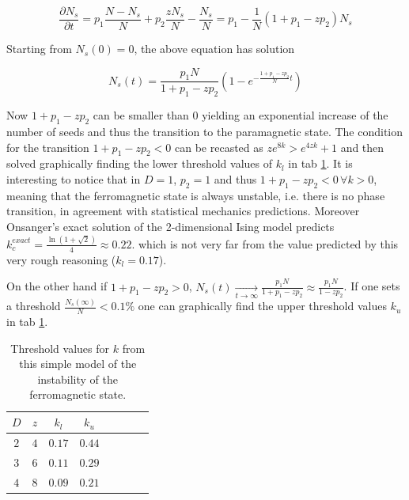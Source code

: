 \documentclass[a4paper, 11pt]{article}
\begin{document}
      \begin{equation}
        \frac{\partial N_{s}}{\partial t} = p_1\frac{N - N_{s}}{N}  + p_2 \frac{zN_s}{N}- \frac{N_{s}}{N} = p_1 - \frac{1}{N}(1 + p_1 - zp_2) N_s
      \end{equation}

      Starting from $N_s(0) = 0$, the above equation has solution

      \begin{equation}
        N_{s}(t) = \frac{p_1N}{1 + p_1 - zp_2}\left(1 - e^{-\frac{1 + p_1 -zp_2}{N}t}  \right)
      \end{equation}

      Now $1 + p_1 - zp_2$ can be smaller than 0 yielding an exponential increase of the number of seeds and thus the transition to the paramagnetic state. The condition for the transition $1 + p_1 - zp_2 < 0$ can be recasted as $ze^{8k} > e^{4zk} + 1$ and then solved graphically finding the lower threshold values of $k_l$ in tab \ref{tab:k_crit_th}.
      It is interesting to notice that in $D = 1$, $p_2 = 1$ and thus $1 + p_1 - zp_2 < 0 \, \forall k > 0$, meaning that the ferromagnetic state is always unstable, i.e. there is no phase transition, in agreement with statistical mechanics predictions. Moreover Onsanger's exact solution of the 2-dimensional Ising model predicts $k_{c}^{exact} = \frac{\ln(1 + \sqrt{2})}{4} \approx 0.22$. which is not very far from the value predicted by this very rough reasoning ($k_l = 0.17$).

      On the other hand if $1 + p_1 - zp_2 > 0$, $N_s(t) \xrightarrow[t \to \infty]{} \frac{p_1N}{1 + p_1 - zp_2} \approx \frac{p_1N}{1 - zp_2}$.
      If one sets a threshold $\frac{N_s(\infty)}{N} < 0.1\%$ one can graphically find the upper threshold values $k_u$ in tab \ref{tab:k_crit_th}.

      \begin{table}[H]
        \centering
        \begin{tabular}{cccccccc}
          \toprule
          $D$ & $z$ & $k_l$ & $k_u$ \\
          \midrule
          $2$ & $4$ & $0.17$ & $0.44$ \\
          $3$ & $6$ & $0.11$ & $0.29$ \\
          $4$ & $8$ & $0.09$ & $0.21$ \\
          \bottomrule
        \end{tabular}
        \caption{Threshold values for $k$ from this simple model of the instability of the ferromagnetic state.}
        \label{tab:k_crit_th}
      \end{table}
\end{document}
